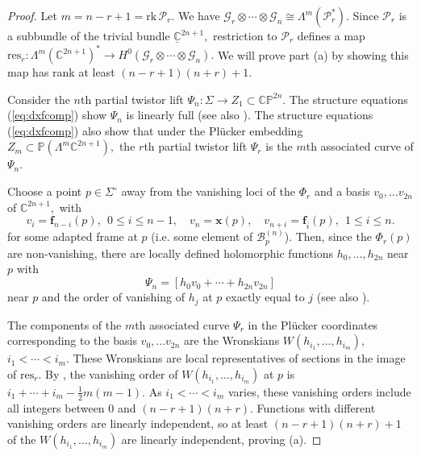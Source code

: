 \documentclass[11pt]{article}
\theoremstyle{definition}
\newcommand{\C}{\mathbb{C}}
\numberwithin{equation}{section}
\begin{document}
\begin{proof}
    Let $m = n-r+1 = \mathrm{rk}\,\mathcal{P}_r.$ We have $\mathcal{G}_r \otimes \cdots \otimes \mathcal{G}_n \cong \Lambda^m (\mathcal{P}_r^*).$ Since $\mathcal{P}_r$ is a subbundle of the trivial bundle $\underline{\C}^{2n+1},$ restriction to $\mathcal{P}_r$ defines a map $\mathrm{res}_r: \Lambda^m (\C^{2n+1})^* \to H^0(\mathcal{G}_r \otimes \cdots \otimes \mathcal{G}_n).$ We will prove part (a) by showing this map has rank at least $(n-r+1)(n+r)+1.$

    Consider the $n$th partial twistor lift $\Psi_n : \Sigma \to Z_1 \subset \mathbb{CP}^{2n}.$ The structure equations (\ref{eq:dxfcomp}) show $\Psi_n$ is linearly full (see also \cite{Barbosa75}). The structure equations (\ref{eq:dxfcomp}) also show that under the Pl\"ucker embedding $Z_m \subset \mathbb{P}(\Lambda^m \C^{2n+1}),$ the $r$th partial twistor lift $\Psi_r$ is the $m$th associated curve of $\Psi_n.$ 
    
    Choose a point $p \in \Sigma^\circ$ away from the vanishing loci of the $\Phi_r$ and a basis $v_0, \ldots v_{2n}$ of $\C^{2n+1},$ with
        \begin{equation*}
            v_i = \mathbf{f}_{n-i}(p), \:\: 0 \leq i \leq n-1, \quad
            v_n = \mathbf{x}(p), \quad v_{n+i} = \mathbf{f}_{\overline{i}}(p), \:\: 1 \leq i \leq n.
        \end{equation*}
    for some adapted frame at $p$ (i.e. some element of $\mathcal{B}^{(n)}_p$). Then, since the $\Phi_r(p)$ are non-vanishing, there are locally defined holomorphic functions $h_0, \ldots, h_{2n}$ near $p$ with
    \begin{equation*}
        \Psi_n = \left[ h_0 v_0 + \cdots + h_{2n} v_{2n} \right]
    \end{equation*}
    near $p$ and the order of vanishing of $h_j$ at $p$ exactly equal to $j$ (see also \cite[\S2.1]{Brycurvenotes19}).
    
    The components of the $m$th associated curve $\Psi_r$ in the Pl\"ucker coordinates corresponding to the basis $v_0, \ldots v_{2n}$ are the Wronskians $W(h_{i_1}, \ldots, h_{i_m}),$ $i_1 < \cdots < i_m.$ These Wronskians are local representatives of sections in the image of $\mathrm{res}_r.$ By \cite[\S2.2]{Brycurvenotes19}, the vanishing order of $W(h_{i_1}, \ldots, h_{i_m})$ at $p$ is $i_1 + \cdots + i_m - \tfrac{1}{2}m(m-1)$. As $i_1 < \cdots < i_m$ varies, these vanishing orders include all integers between $0$ and $(n-r+1)(n+r).$ Functions with different vanishing orders are linearly independent, so at least $(n-r+1)(n+r)+1$ of the $W(h_{i_1}, \ldots, h_{i_m})$ are linearly independent, proving (a).


\end{proof}
\end{document}
